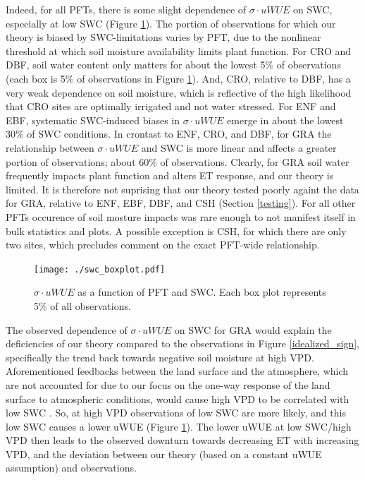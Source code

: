 \documentclass[draft,linenumbers]{agujournal}
\begin{document}
Indeed, for all PFTs, there is some slight dependence of $\sigma \cdot uWUE$ on SWC, especially at low SWC (Figure \ref{swc_boxplot}). The portion of observations for which our theory is biased by SWC-limitations varies by PFT, due to the nonlinear threshold at which soil moisture availability limits plant function. For CRO and DBF, soil water content only matters for about the lowest 5\% of observations (each box is 5\% of observations in Figure \ref{swc_boxplot}). And, CRO, relative to DBF, has a very weak dependence on soil moisture, which is reflective of the high likelihood that CRO sites are optimally irrigated and not water stressed. For ENF and EBF, systematic SWC-induced biases in $\sigma \cdot uWUE$ emerge in about the lowest 30\% of SWC conditions. In crontast to ENF, CRO, and DBF, for GRA the relationship between $\sigma \cdot uWUE$ and SWC is more linear and affects a greater portion of observations; about 60\% of observations. Clearly, for GRA soil water frequently impacts plant function and alters ET response, and our theory is limited. It is therefore not suprising that our theory tested poorly againt the data for GRA, relative to ENF, EBF, DBF, and CSH (Section \ref{testing}). For all other PFTs occurence of soil mosture impacts was rare enough to not manifest itself in bulk statistics and plots. A possible exception is CSH, for which there are only two sites, which precludes comment on the exact PFT-wide relationship.

\begin{figure}
\centering
\centerline{\texttt{[image: ./swc\_boxplot.pdf]}}
\caption{$\sigma \cdot uWUE$ as a function of PFT and SWC. Each box plot represents 5\% of all observations.}
\label{swc_boxplot}
\end{figure}

The observed dependence of $\sigma \cdot uWUE$ on SWC for GRA would explain the deficiencies of our theory compared to the observations in Figure \ref{idealized_sign}, specifically the trend back towards negative soil moisture at high VPD. Aforementioned feedbacks between the land surface and the atmosphere, which are not accounted for due to our focus on the one-way response of the land surface to atmospheric conditions, would cause high VPD to be correlated with low SWC \citep[][]{Gentine_2016, Berg_2016}. So, at high VPD observations of low SWC are more likely, and this low SWC causes a lower uWUE (Figure \ref{swc_boxplot}). The lower uWUE at low SWC/high VPD then leads to the observed downturn towards decreasing ET with increasing VPD, and the deviation between our theory (based on a constant uWUE assumption) and observations.
\end{document}
